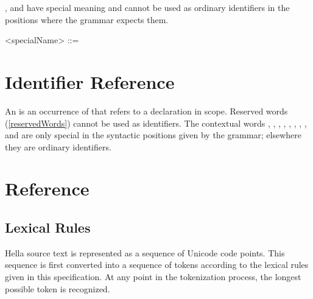 \documentclass[makeidx]{article}
\begin{document}
\LMHash{}%
,  and  have special meaning and
cannot be used as ordinary identifiers in the positions where the
grammar expects them.

\begin{grammar}
<specialName> ::= \THIS{}
  \alt \SUPER{}
  \alt \SELF{}
\end{grammar}

\section{Identifier Reference}

\LMHash{}%
An  is an occurrence of 
that refers to a declaration in scope.
Reserved words (\ref{reservedWords}) cannot be used as identifiers.
The contextual words , , ,
, , , , ,
 and  are only special in the syntactic
positions given by the grammar; elsewhere they are ordinary
identifiers.

\section{Reference}

\subsection{Lexical Rules}

\LMHash{}%
Hella source text is represented as a sequence of Unicode code points.
This sequence is first converted into a sequence of tokens
according to the lexical rules given in this specification.
At any point in the tokenization process,
the longest possible token is recognized.

\end{document}
